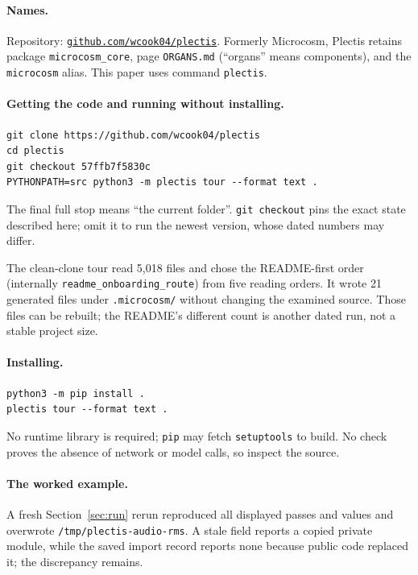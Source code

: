 \documentclass[11pt]{article}
\newcommand{\code}[1]{\texttt{#1}}
\newcommand{\component}[1]{\nolinkurl{#1}}
\newcommand{\repo}{\href{https://github.com/wcook04/plectis}{\nolinkurl{github.com/wcook04/plectis}}}
\begin{document}
\paragraph{Names.} Repository: \repo. Formerly Microcosm, Plectis retains
package \code{microcosm\_core}, page \code{ORGANS.md} (``organs'' means
components), and the \code{microcosm} alias. This paper uses command
\code{plectis}.

\paragraph{Getting the code and running without installing.}

\begin{Verbatim}[fontsize=\small]
git clone https://github.com/wcook04/plectis
cd plectis
git checkout 57ffb7f5830c
PYTHONPATH=src python3 -m plectis tour --format text .
\end{Verbatim}

The final full stop means ``the current folder''. \code{git checkout} pins the
exact state described here; omit it to run the newest version, whose dated
numbers may differ.

The clean-clone tour read 5{,}018 files and chose the README-first order
(internally \component{readme_onboarding_route}) from five reading orders. It
wrote 21 generated files under \code{.microcosm/} without changing the examined
source. Those files can be rebuilt; the README's different count is another
dated run, not a stable project size.

\paragraph{Installing.}

\begin{Verbatim}[fontsize=\small]
python3 -m pip install .
plectis tour --format text .
\end{Verbatim}

No runtime library is required; \code{pip} may fetch \code{setuptools} to
build. No check proves the absence of network or model calls, so inspect the
source.

\paragraph{The worked example.} A fresh Section~\ref{sec:run} rerun reproduced
all displayed passes and values and overwrote \component{/tmp/plectis-audio-rms}.
A stale field reports a copied private module, while the saved import record
reports none because public code replaced it; the discrepancy remains.
\end{document}
